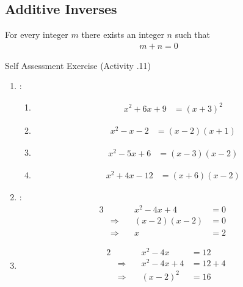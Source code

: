 \documentclass[../notes.tex]{subfiles}
\begin{document}
			\subsection{Additive Inverses}
				For every integer $m$ there exists an integer $n$ such that
				\nopagebreak
				\begin{align*}
					m + n = 0
				\end{align*}
			\pagebreak
			\begin{exercise}{Self Assessment Exercise (Activity \thechapter.11)}
				\begin{enumerate}
					\item {}:
						\begin{enumerate}[label=(\alph*)]
							\item \moveup
								\begin{align*}
									x^{2} + 6x + 9 &= (x + 3)^{2}
								\end{align*}
							\item \moveup
								\begin{align*}
									x^{2} - x - 2 &= (x - 2)(x + 1)
								\end{align*}
							\item \moveup
								\begin{align*}
									x^{2} - 5x + 6 &= (x - 3)(x - 2)
								\end{align*}
							\item \moveup
								\begin{align*}
									x^{2} + 4x - 12 &= (x + 6)(x - 2)
								\end{align*}
						\end{enumerate}
					\item {}:
						\begin{alignat*}{3}
							& \qquad & x^{2} - 4x + 4 &= 0\\
							& \Rightarrow \quad & (x - 2)(x - 2) &= 0\\
							& \Rightarrow \quad &x &= 2 &
						\end{alignat*}
					\item {}
						\begin{alignat*}{2}
							& \qquad &x^{2} - 4x &= 12\\
							& \Rightarrow \quad &x^{2} - 4x + 4 &= 12 + 4\\
							& \Rightarrow \quad &(x - 2)^{2} &= 16\\

\end{alignat*}
\end{enumerate}
\end{exercise}
\end{document}
